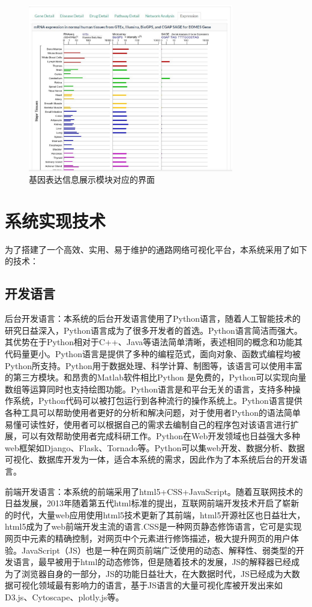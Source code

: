 \begin{figure}[!hbtp]
\centering
\includegraphics[width = 0.8\textwidth]{juti6}
\caption[fig33]{基因表达信息展示模块对应的界面}
\label{juti6}
\end{figure}


\section{系统实现技术}
为了搭建了一个高效、实用、易于维护的通路网络可视化平台，本系统采用了如下的技术：

\subsection{开发语言}
后台开发语言：本系统的后台开发语言使用了Python语言，随着人工智能技术的研究日益深入，Python语言成为了很多开发者的首选。Python语言简洁而强大。其优势在于Python相对于C++、Java等语法简单清晰，表述相同的概念和功能其代码量更小。Python语言是提供了多种的编程范式，面向对象、函数式编程均被Python所支持。Python用于数据处理、科学计算、制图等，该语言可以使用丰富的第三方模块。和昂贵的Matlab软件相比Python 是免费的，Python可以实现向量数组等运算同时也支持绘图功能。Python语言是和平台无关的语言，支持多种操作系统，Python代码可以被打包运行到各种流行的操作系统上。Python语言提供各种工具可以帮助使用者更好的分析和解决问题，对于使用者Python的语法简单易懂可读性好，使用者可以根据自己的需求去编制自己的程序包对该语言进行扩展，可以有效帮助使用者完成科研工作。Python在Web开发领域也日益强大多种web框架如Django、Flask、Tornado等。Python可以集web开发、数据分析、数据可视化、数据库开发为一体，适合本系统的需求，因此作为了本系统后台的开发语言。

前端开发语言：本系统的前端采用了html5+CSS+JavaScript。随着互联网技术的日益发展，2013年随着第五代html标准的提出，互联网前端开发技术开启了崭新的时代，大量web应用使用html5技术更新了其前端，html5开源社区也日益壮大，html5成为了web前端开发主流的语言.CSS是一种网页静态修饰语言，它可是实现网页中元素的精确控制，对网页中个元素进行修饰描述，极大提升网页的用户体验。JavaScript（JS）也是一种在网页前端广泛使用的动态、解释性、弱类型的开发语言，最早被用于html的动态修饰，但是随着技术的发展，JS的解释器已经成为了浏览器自身的一部分，JS的功能日益壮大，在大数据时代，JS已经成为大数据可视化领域最有影响力的语言，基于JS语言的大量可视化库被开发出来如D3.js、Cytoscape、plotly.js等。

